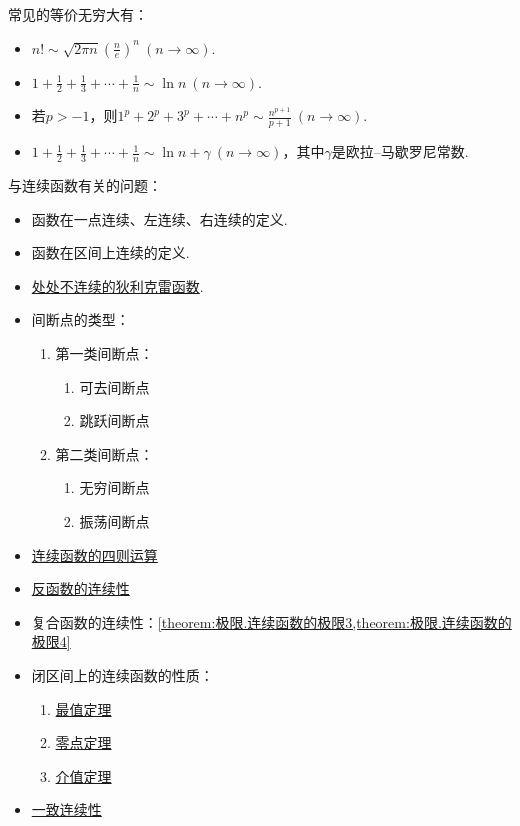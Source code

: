 常见的等价无穷大有：
\begin{itemize}
	\item \(n! \sim \sqrt{2 \pi n} \left( \frac{n}{e} \right)^n\ (n\to\infty)\).
	\item \(1+\frac12+\frac13+\dotsb+\frac1n \sim \ln n\ (n\to\infty)\).
	\item 若\(p>-1\)，则\(1^p+2^p+3^p+\dotsb+n^p \sim \frac{n^{p+1}}{p+1}\ (n\to\infty)\).%
	\item \(1+\frac12+\frac13+\dotsb+\frac1n \sim \ln n + \gamma\ (n\to\infty)\)，其中\(\gamma\)是欧拉--马歇罗尼常数.%
\end{itemize}

与连续函数有关的问题：
\begin{itemize}
	\item 函数在一点连续、左连续、右连续的定义.
	\item 函数在区间上连续的定义.
	\item \hyperref[example:连续函数.狄利克雷函数处处不连续]{处处不连续的狄利克雷函数}.
	\item 间断点的类型：\begin{enumerate}
		\item 第一类间断点：\begin{enumerate}
			\item 可去间断点
			\item 跳跃间断点
		\end{enumerate}
		\item 第二类间断点：\begin{enumerate}
			\item 无穷间断点
			\item 振荡间断点
		\end{enumerate}
	\end{enumerate}
	\item \hyperref[theorem:极限.连续函数的极限1]{连续函数的四则运算}
	\item \hyperref[theorem:极限.连续函数的极限2]{反函数的连续性}
	\item 复合函数的连续性：\cref{theorem:极限.连续函数的极限3,theorem:极限.连续函数的极限4}
	\item 闭区间上的连续函数的性质：\begin{enumerate}
		\item \hyperref[theorem:极限.最值定理]{最值定理}
		\item \hyperref[theorem:极限.零点定理]{零点定理}
		\item \hyperref[theorem:极限.闭区间上连续函数的性质.介值定理1]{介值定理}
	\end{enumerate}
	\item \hyperref[definition:极限.函数的一致连续性]{一致连续性}
\end{itemize}

